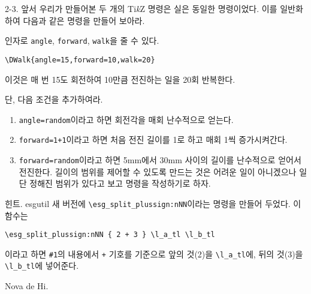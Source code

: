 \documentclass[a4paper,amsmath]{oblivoir}
\makeatletter
\let\ATonum\@onum
\newcommand\tikzlogo{Ti\textit{k}Z}
\makeatother
\begin{document}
\begin{questionp}
 2-3. 앞서 우리가 만들어본 두 개의 \tikzlogo{} 명령은 실은 동일한 명령이었다. 이를 일반화하여 다음과 같은 명령을 만들어 보아라.

인자로 \texttt{angle}, \texttt{forward}, \texttt{walk}을 줄 수 있다.
\begin{verbatim}
\DWalk{angle=15,forward=10,walk=20}
\end{verbatim}
이것은 매 번 15도 회전하여 10만큼 전진하는 일을 20회 반복한다.

단, 다음 조건을 추가하여라.
\begin{enumerate}[\expandafter\ATonum1] \firmlist
\item \verb|angle=random|이라고 하면 회전각을 매회 난수적으로 얻는다.
\item \verb|forward=1+1|이라고 하면 처음 전진 길이를 1로 하고 매회 1씩 증가시켜간다.
\item \verb|forward=random|이라고 하면 5mm에서 30mm 사이의 길이를 난수적으로 얻어서 전진한다. 길이의 범위를 제어할 수 있도록 만드는 것은 어려운 일이 아니겠으나 일단 정해진 범위가 있다고 보고 명령을 작성하기로 하자.
\end{enumerate}

\hrulefill

힌트. \textsf{esgutil} 새 버전에 \verb|\esg_split_plussign:nNN|이라는 명령을 만들어 두었다. 이 함수는
\begin{verbatim}
\esg_split_plussign:nNN { 2 + 3 } \l_a_tl \l_b_tl
\end{verbatim}
이라고 하면 \verb|#1|의 내용에서 \verb|+| 기호를 기준으로 앞의 것(2)을 \verb|\l_a_tl|에, 뒤의 것(3)을 \verb|\l_b_tl|에 넣어준다.
\end{questionp}


\vfill
\hfill Nova de Hi.
\end{document}
